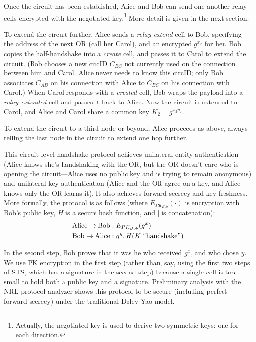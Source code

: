 \documentclass[times,10pt,twocolumn]{article}
\begin{document}
Once the circuit has been established, Alice and Bob can send one
another relay cells encrypted with the negotiated
key.\footnote{Actually, the negotiated key is used to derive two
  symmetric keys: one for each direction.}  More detail is given in
the next section.

To extend the circuit further, Alice sends a \emph{relay extend} cell
to Bob, specifying the address of the next OR (call her Carol), and
an encrypted $g^{x_2}$ for her.  Bob copies the half-handshake into a
\emph{create} cell, and passes it to Carol to extend the circuit.
(Bob chooses a new circID $C_{BC}$ not currently used on the connection
between him and Carol.  Alice never needs to know this circID; only Bob
associates $C_{AB}$ on his connection with Alice to $C_{BC}$ on
his connection with Carol.)
When Carol responds with a \emph{created} cell, Bob wraps the payload
into a \emph{relay extended} cell and passes it back to Alice.  Now
the circuit is extended to Carol, and Alice and Carol share a common key
$K_2 = g^{x_2 y_2}$.

To extend the circuit to a third node or beyond, Alice
proceeds as above, always telling the last node in the circuit to
extend one hop further.

This circuit-level handshake protocol achieves unilateral entity
authentication (Alice knows she's handshaking with the OR, but
the OR doesn't care who is opening the circuit---Alice uses no public key
and is trying to remain anonymous) and unilateral key authentication
(Alice and the OR agree on a key, and Alice knows only the OR learns
it). It also achieves forward
secrecy and key freshness. More formally, the protocol is as follows
(where $E_{PK_{Bob}}(\cdot)$ is encryption with Bob's public key,
$H$ is a secure hash function, and $|$ is concatenation):
\begin{equation*}
\begin{aligned}
\mathrm{Alice} \rightarrow \mathrm{Bob}&: E_{PK_{Bob}}(g^x) \\
\mathrm{Bob} \rightarrow \mathrm{Alice}&: g^y, H(K | \mathrm{``handshake"}) \\
\end{aligned}
\end{equation*}

\noindent In the second step, Bob proves that it was he who received $g^x$,
and who chose $y$. We use PK encryption in the first step
(rather than, say, using the first two steps of STS, which has a
signature in the second step) because a single cell is too small to
hold both a public key and a signature. Preliminary analysis with the
NRL protocol analyzer \cite{meadows96} shows this protocol to be
secure (including perfect forward secrecy) under the
traditional Dolev-Yao model.\\
\end{document}
